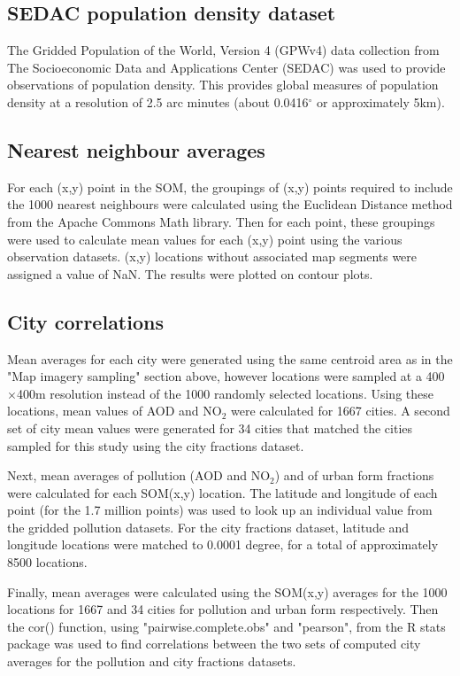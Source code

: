 \documentclass[9pt,twocolumn,twoside,lineno]{pnas-new}
\begin{document}
{\subsection*{SEDAC population density dataset}\label{populationdata}
The Gridded Population of the World, Version 4 (GPWv4) data collection\cite{CIESIN2018} from The Socioeconomic Data and Applications Center (SEDAC) was used to provide observations of population density. This provides global measures of population density at a resolution of 2.5 arc minutes (about 0.0416$^\circ$ or approximately 5km).

\subsection*{Nearest neighbour averages}\label{knndata}
For each (x,y) point in the SOM, the groupings of (x,y) points required to include the 1000 nearest neighbours were calculated using the Euclidean Distance method from the Apache Commons Math library\cite{ApacheCommons2019}. Then for each point, these groupings were used to calculate mean values for each (x,y) point using the various observation datasets. (x,y) locations without associated map segments were assigned a value of NaN. The results were plotted on contour plots.

\subsection*{City correlations}\label{correlations}
Mean averages for each city were generated using the same centroid area as in the "Map imagery sampling" section above, however locations were sampled at a 400$\times$400m resolution instead of the 1000 randomly selected locations. Using these locations, mean values of AOD and NO$_{2}$ were calculated for 1667 cities. A second set of city mean values were generated for 34 cities that matched the cities sampled for this study using the city fractions dataset.

Next, mean averages of pollution (AOD and NO$_{2}$) and of urban form fractions were calculated for each SOM(x,y) location. The latitude and longitude of each point (for the 1.7 million points) was used to look up an individual value from the gridded pollution datasets. For the city fractions dataset, latitude and longitude locations were matched to 0.0001 degree, for a total of approximately 8500 locations.

Finally, mean averages were calculated using the SOM(x,y) averages for the 1000 locations for 1667 and 34 cities for pollution and urban form respectively. Then the cor() function, using "pairwise.complete.obs" and "pearson", from the R stats package\cite{RCoreTeam2015} was used to find correlations between the two sets of computed city averages for the pollution and city fractions datasets.

}
\end{document}
